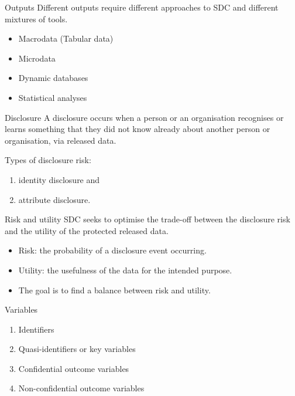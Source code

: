 \documentclass[
  ignorenonframetext,
  aspectratio=169,
]{beamer}
\providecommand{\tightlist}{%
  \setlength{\itemsep}{0pt}\setlength{\parskip}{0pt}}\usepackage{longtable,booktabs,array}
\begin{document}
\begin{frame}{Outputs}
\protect\hypertarget{outputs}{}
Different outputs require different approaches to SDC and different
mixtures of tools.

\begin{itemize}
\item
  Macrodata (Tabular data)
\item
  Microdata
\item
  Dynamic databases
\item
  Statistical analyses
\end{itemize}
\end{frame}

\begin{frame}{Disclosure}
\protect\hypertarget{disclosure}{}
A disclosure occurs when a person or an organisation recognises or
learns something that they did not know already about another person or
organisation, via released data.

Types of disclosure risk:

\begin{enumerate}
[(1)]
\tightlist
\item
  identity disclosure and
\item
  attribute disclosure.
\end{enumerate}
\end{frame}

\begin{frame}{Risk and utility}
\protect\hypertarget{risk-and-utility}{}
SDC seeks to optimise the trade-off between the disclosure risk and the
utility of the protected released data.

\begin{itemize}
\item
  Risk: the probability of a disclosure event occurring.
\item
  Utility: the usefulness of the data for the intended purpose.
\item
  The goal is to find a balance between risk and utility.
\end{itemize}
\end{frame}

\begin{frame}{Variables}
\protect\hypertarget{variables}{}
\begin{enumerate}
\tightlist
\item
  Identifiers
\item
  Quasi-identifiers or key variables
\item
  Confidential outcome variables
\item
  Non-confidential outcome variables
\end{enumerate}
\end{frame}
\end{document}
